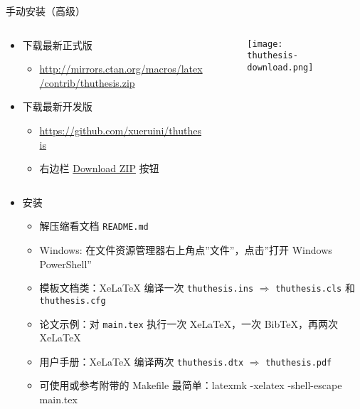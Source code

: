 \begin{frame}{手动安装\ThuThesis{}（高级）}
      \begin{columns}
        \begin{column}{.7\textwidth}
  \begin{itemize}
    \item 下载最新正式版
      \begin{itemize}
        \item \url{http://mirrors.ctan.org/macros/latex/contrib/thuthesis.zip}
      \end{itemize}
    \item 下载最新开发版
      \begin{itemize}
        \item \url{https://github.com/xueruini/thuthesis}
        \item 右边栏
          \href{https://github.com/xueruini/thuthesis/archive/master.zip}%
          {Download ZIP} 按钮
      \end{itemize}
  \end{itemize}
        \end{column}
        \begin{column}{.3\textwidth}
          \begin{figure}[htbp]
            \centering
            \texttt{[image: thuthesis-download.png]}
          \end{figure}
        \end{column}
      \end{columns}
  \begin{itemize}
    \item 安装
      \begin{itemize}
        \item 解压缩看文档 \texttt{README.md}
        \item Windows: 在文件资源管理器右上角点''文件''，点击''打开 Windows PowerShell''
        \item 模板文档类：XeLaTeX 编译一次 \texttt{thuthesis.ins} $\Rightarrow$
          \texttt{thuthesis.cls} 和 \texttt{thuthesis.cfg}
        \item 论文示例：对 \texttt{main.tex} 执行一次 XeLaTeX，一次 BibTeX，再两次
          XeLaTeX
        \item 用户手册：XeLaTeX 编译两次 \texttt{thuthesis.dtx} $\Rightarrow$
          \texttt{thuthesis.pdf}
        \item 可使用或参考附带的 Makefile 最简单：latexmk -xelatex -shell-escape main.tex
      \end{itemize}
  \end{itemize}
\end{frame}

